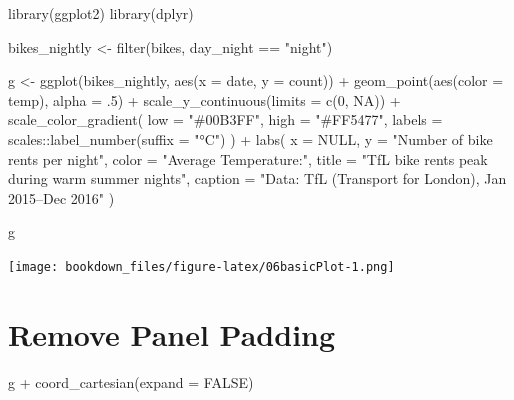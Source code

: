 \documentclass[
]{krantz}
\makeatletter
\newenvironment{Shaded}{\begin{snugshade}}{\end{snugshade}}
\newcommand{\AttributeTok}[1]{\textcolor[rgb]{0.61,0.61,0.61}{#1}}
\newcommand{\ConstantTok}[1]{\textcolor[rgb]{0,0,0}{#1}}
\newcommand{\DecValTok}[1]{\textcolor[rgb]{0.06,0.06,0.06}{#1}}
\newcommand{\FunctionTok}[1]{\textcolor[rgb]{0,0,0}{#1}}
\newcommand{\NormalTok}[1]{#1}
\newcommand{\OtherTok}[1]{\textcolor[rgb]{0.37,0.37,0.37}{#1}}
\newcommand{\SpecialCharTok}[1]{\textcolor[rgb]{0,0,0}{#1}}
\newcommand{\StringTok}[1]{\textcolor[rgb]{0.5,0.5,0.5}{#1}}
\newenvironment{kframe}{%
\medskip{}
\setlength{\fboxsep}{.8em}
 \def\at@end@of@kframe{}%
 \ifinner\ifhmode%
  \def\at@end@of@kframe{\end{minipage}}%
  \begin{minipage}{\columnwidth}%
 \fi\fi%
 \def\FrameCommand##1{\hskip\@totalleftmargin \hskip-\fboxsep
 \colorbox{shadecolor}{##1}\hskip-\fboxsep
     \hskip-\linewidth \hskip-\@totalleftmargin \hskip\columnwidth}%
 \MakeFramed {\advance\hsize-\width
   \@totalleftmargin\z@ \linewidth\hsize
   \@setminipage}}%
 {\par\unskip\endMakeFramed%
 \at@end@of@kframe}
\renewenvironment{Shaded}{\begin{kframe}}{\end{kframe}}
\makeatother
\begin{document}
\begin{Shaded}
\begin{Highlighting}[]
\FunctionTok{library}\NormalTok{(ggplot2)}
\FunctionTok{library}\NormalTok{(dplyr)}

\NormalTok{bikes\_nightly }\OtherTok{\textless{}{-}} \FunctionTok{filter}\NormalTok{(bikes, day\_night }\SpecialCharTok{==} \StringTok{"night"}\NormalTok{)}

\NormalTok{g }\OtherTok{\textless{}{-}} 
  \FunctionTok{ggplot}\NormalTok{(bikes\_nightly, }\FunctionTok{aes}\NormalTok{(}\AttributeTok{x =}\NormalTok{ date, }\AttributeTok{y =}\NormalTok{ count)) }\SpecialCharTok{+} 
  \FunctionTok{geom\_point}\NormalTok{(}\FunctionTok{aes}\NormalTok{(}\AttributeTok{color =}\NormalTok{ temp), }\AttributeTok{alpha =}\NormalTok{ .}\DecValTok{5}\NormalTok{) }\SpecialCharTok{+}
  \FunctionTok{scale\_y\_continuous}\NormalTok{(}\AttributeTok{limits =} \FunctionTok{c}\NormalTok{(}\DecValTok{0}\NormalTok{, }\ConstantTok{NA}\NormalTok{)) }\SpecialCharTok{+}
  \FunctionTok{scale\_color\_gradient}\NormalTok{(}
    \AttributeTok{low =} \StringTok{"\#00B3FF"}\NormalTok{, }\AttributeTok{high =} \StringTok{"\#FF5477"}\NormalTok{, }
    \AttributeTok{labels =}\NormalTok{ scales}\SpecialCharTok{::}\FunctionTok{label\_number}\NormalTok{(}\AttributeTok{suffix =} \StringTok{"°C"}\NormalTok{)}
\NormalTok{  ) }\SpecialCharTok{+}
  \FunctionTok{labs}\NormalTok{(}
    \AttributeTok{x =} \ConstantTok{NULL}\NormalTok{, }\AttributeTok{y =} \StringTok{"Number of bike rents per night"}\NormalTok{, }\AttributeTok{color =} \StringTok{"Average Temperature:"}\NormalTok{,}
    \AttributeTok{title =} \StringTok{"TfL bike rents peak during warm summer nights"}\NormalTok{,}
    \AttributeTok{caption =} \StringTok{"Data: TfL (Transport for London), Jan 2015–Dec 2016"}
\NormalTok{  )}

\NormalTok{g}
\end{Highlighting}
\end{Shaded}

\texttt{[image: bookdown\_files/figure-latex/06basicPlot-1.png]}

\hypertarget{remove-panel-padding}{%
\section{Remove Panel Padding}\label{remove-panel-padding}}

\begin{Shaded}
\begin{Highlighting}[]
\NormalTok{g }\SpecialCharTok{+} \FunctionTok{coord\_cartesian}\NormalTok{(}\AttributeTok{expand =} \ConstantTok{FALSE}\NormalTok{)}
\end{Highlighting}
\end{Shaded}
\end{document}
